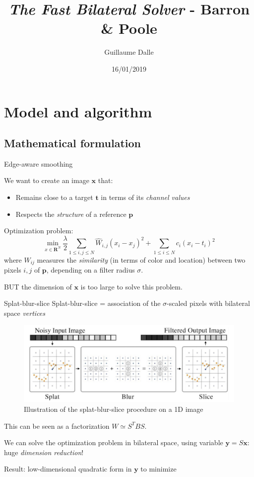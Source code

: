 \documentclass{beamer}
\title[The Fast Bilateral Solver]{\textit{The Fast Bilateral Solver}
- Barron \& Poole}
\author{Guillaume Dalle}
\institute{MVA - Imagerie numérique}
\date{16/01/2019}
\begin{document}
\begin{frame}
\titlepage
\end{frame}

\section{Model and algorithm}

\subsection{Mathematical formulation}

\begin{frame}{Edge-aware smoothing}

We want to create an image $\textbf{x}$ that:
\begin{itemize}
    \item Remains close to a target $\textbf{t}$ in terms of its \textit{channel values}
    \item Respects the \textit{structure} of a reference $\textbf{p}$
\end{itemize}

\pause
Optimization problem:
$$\min_{x \in \textbf{R}^N} \frac{\lambda}{2} \sum_{1 \leq i, j \leq N}{\hat{W}_{i, j} (x_i - x_j)^2} + \sum_{1 \leq i \leq N}{c_i (x_i - t_i)^2}$$
where $W_{ij}$ measures the \textit{similarity} (in terms of color and location) between two pixels $i,j$ of $\textbf{p}$, depending on a filter radius $\sigma$.

\pause
BUT the dimension of $\textbf{x}$ is too large to solve this problem.
\end{frame}

\begin{frame}{Splat-blur-slice}
Splat-blur-slice = association of the $\sigma$-scaled pixels with bilateral space \textit{vertices}

\pause

\begin{figure}
\centering
\includegraphics[width=0.8\linewidth]{pictures/SBS.png}
\caption{Illustration of the splat-blur-slice procedure on a 1D image}
\end{figure}

\pause
This can be seen as a factorization $W \simeq S^T B S$.

We can solve the optimization problem in bilateral space, using variable $\textbf{y} = S \textbf{x}$: huge \textit{dimension reduction}!

Result: low-dimensional quadratic form in $\textbf{y}$ to minimize
\end{frame}
\end{document}

